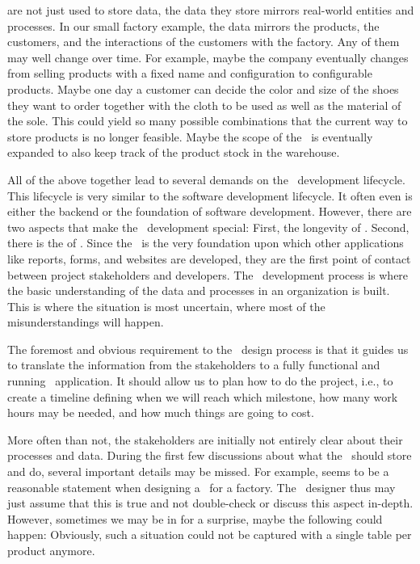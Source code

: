  are not just used to store data, the data they store mirrors real-world entities and processes.
In our small factory example, the data mirrors the products, the customers, and the interactions of the customers with the factory.
Any of them may well change over time.
For example, maybe the company eventually changes from selling products with a fixed name and configuration to configurable products.
Maybe one day a customer can decide the color and size of the shoes they want to order together with the cloth to be used as well as the material of the sole.
This could yield so many possible combinations that the current way to store products is no longer feasible.
Maybe the scope of the \db\ is eventually expanded to also keep track of the product stock in the warehouse.

All of the above together lead to several demands on the \db\ development lifecycle.
This lifecycle is very similar to the software development lifecycle.
It often even is either the backend or the foundation of software development.
However, there are two aspects that make the \db\ development special:
First, the longevity of .
Second, there is the  of .
Since the \db\ is the very foundation upon which other applications like reports, forms, and websites are developed, they are the first point of contact between project stakeholders and developers.
The \db\ development process is where the basic understanding of the data and processes in an organization is built.
This is where the situation is most uncertain, where most of the misunderstandings will happen.

The foremost and obvious requirement to the \db\ design process is that it guides us to translate the information from the stakeholders to a fully functional and running \db\ application.
It should allow us to plan how to do the project, i.e., to create a timeline defining when we will reach which milestone, how many work hours may be needed, and how much things are going to cost.

More often than not, the stakeholders are initially not entirely clear about their processes and data.
During the first few discussions about what the \db\ should store and do, several important details may be missed.
For example,  seems to be a reasonable statement when designing a \db\ for a factory.
The \db\ designer thus may just assume that this is true and not double-check or discuss this aspect in-depth.
However, sometimes we may be in for a surprise, maybe the following could happen:
Obviously, such a situation could not be captured with a single table per product anymore.

